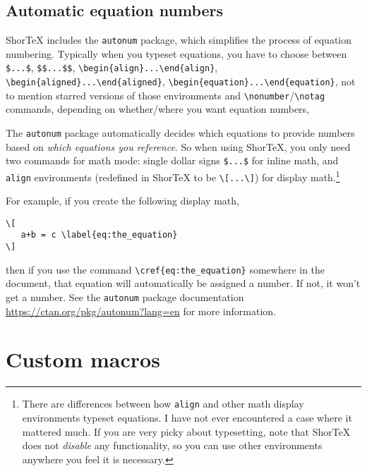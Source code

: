 \documentclass{article}
\begin{document}
\subsection{Automatic equation numbers}

ShorTeX includes the \texttt{autonum} package, which simplifies the process of 
equation numbering. Typically when you typeset equations, you have to choose between 
\verb!$...$!, \verb!$$...$$!, 
\verb!\begin{align}...\end{align}!, 
\verb!\begin{aligned}...\end{aligned}!, 
\verb!\begin{equation}...\end{equation}!, 
not to mention starred versions of those environments 
and \verb!\nonumber!/\verb!\notag! commands, depending 
on whether/where you want equation numbers,

The \texttt{autonum} package automatically decides which equations to provide
numbers based on \textit{which equations you reference}. So when using ShorTeX,
you only need two commands for math mode: single dollar signs \verb!$...$! for
inline math, and \texttt{align} environments (redefined in ShorTeX to be
\verb!\[...\]!) for display math.\footnote{There are
differences between how \texttt{align} and 
other math display environments typeset equations. I have not ever
encountered a case where it mattered much. If you are very picky about typesetting,
note that ShorTeX does not \emph{disable} any functionality, so you 
can use other environments anywhere you feel it is necessary.}

For example, if you create 
the following display math,
\begin{verbatim}
\[
   a+b = c \label{eq:the_equation}
\]
\end{verbatim}
then if you use the command \verb!\cref{eq:the_equation}! somewhere
in the document, that equation will automatically be assigned a number. If not, it
won't get a number. See the \texttt{autonum} package 
documentation \url{https://ctan.org/pkg/autonum?lang=en} for more information.



\section{Custom macros}
\end{document}
